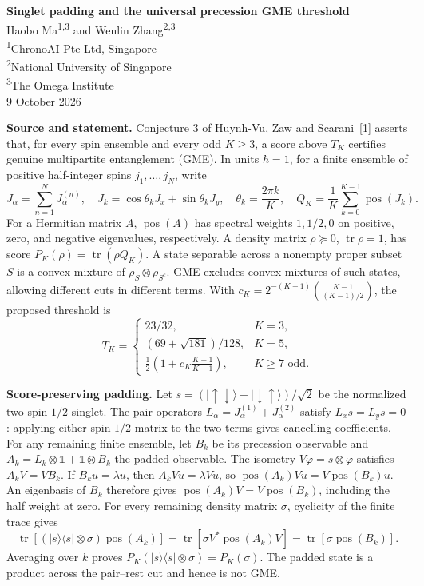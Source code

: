 \documentclass[11pt,a4paper]{article}
\newcommand{\pos}{\operatorname{pos}}
\newcommand{\tr}{\operatorname{tr}}
\newcommand{\ket}[1]{\lvert #1\rangle}
\newcommand{\bra}[1]{\langle #1\rvert}
\newcommand{\id}{\mathbb{1}}
\begin{document}
\begin{center}
{\Large\bfseries Singlet padding and the universal precession GME threshold}\\[5pt]
Haobo Ma\textsuperscript{1,3} and Wenlin Zhang\textsuperscript{2,3}\\[3pt]
{\small\textsuperscript{1}ChronoAI Pte Ltd, Singapore}\\
{\small\textsuperscript{2}National University of Singapore}\\
{\small\textsuperscript{3}The Omega Institute}\\[3pt]
9 October 2026
\end{center}

\textbf{Source and statement.}
Conjecture 3 of Huynh-Vu, Zaw and Scarani~[1] asserts that, for every spin
ensemble and every odd $K\geq3$, a score above $T_K$ certifies genuine
multipartite entanglement (GME). In units $\hbar=1$, for a finite ensemble
of positive half-integer spins $j_1,\ldots,j_N$, write
\[
J_\alpha=\sum_{n=1}^{N}J_\alpha^{(n)},\quad
J_k=\cos\theta_k J_x+\sin\theta_k J_y,\quad
\theta_k=\frac{2\pi k}{K},\quad
Q_K=\frac1K\sum_{k=0}^{K-1}\pos(J_k).
\]
For a Hermitian matrix $A$, $\pos(A)$ has spectral weights $1,1/2,0$
on positive, zero, and negative eigenvalues, respectively. A density matrix
$\rho\succeq0$, $\tr\rho=1$, has score $P_K(\rho)=\tr(\rho Q_K)$.
A state separable across a nonempty proper subset $S$ is a convex mixture
of $\rho_S\otimes\rho_{S^c}$. GME excludes convex mixtures of such states,
allowing different cuts in different terms. With
$c_K=2^{-(K-1)}\binom{K-1}{(K-1)/2}$, the proposed threshold is
\[
T_K=\begin{cases}
23/32,&K=3,\\
(69+\sqrt{181})/128,&K=5,\\
\frac12\left(1+c_K\frac{K-1}{K+1}\right),&K\geq7\text{ odd}.
\end{cases}
\]

\textbf{Score-preserving padding.}
Let $s=(\ket{\uparrow\downarrow}-\ket{\downarrow\uparrow})/\sqrt2$ be
the normalized two-spin-$1/2$ singlet. The pair operators
$L_\alpha=J_\alpha^{(1)}+J_\alpha^{(2)}$ satisfy $L_xs=L_ys=0$:
applying either spin-$1/2$ matrix to the two terms gives cancelling coefficients.
For any remaining finite ensemble, let $B_k$ be its precession observable
and $A_k=L_k\otimes\id+\id\otimes B_k$ the padded observable.
The isometry $V\varphi=s\otimes\varphi$ satisfies $A_kV=VB_k$.
If $B_k u=\lambda u$, then $A_k Vu=\lambda Vu$, so
$\pos(A_k)Vu=V\pos(B_k)u$. An eigenbasis of $B_k$ therefore gives
$\pos(A_k)V=V\pos(B_k)$, including the half weight at zero.
For every remaining density matrix $\sigma$, cyclicity of the finite trace gives
\[
\tr\!\left[(\ket{s}\bra{s}\otimes\sigma)\pos(A_k)\right]
=\tr\!\left[\sigma V^*\pos(A_k)V\right]
=\tr[\sigma\pos(B_k)].
\]
Averaging over $k$ proves $P_K(\ket{s}\bra{s}\otimes\sigma)=P_K(\sigma)$.
The padded state is a product across the pair--rest cut and hence is not GME.
\end{document}
